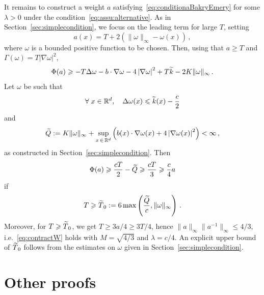 \documentclass[AHL,Unicode,longabstracts,published]{cedram}
\newcommand{\R}{\mathbb R}
\newcommand{\na}{\nabla}
\newcommand{\1}{\mathbbm{1}}
\newcommand{\nv}[1]{#1}
\let\oldtilde\tilde
\renewcommand*{\tilde}[1]{\mathchoice{\widetilde{#1}}{\widetilde{#1}}{\oldtilde{#1}}{\oldtilde{#1}}}
\let\oldforall\forall
\renewcommand*{\forall}{\mathrel{\oldforall}}
\newcommand{\R}{\mathbb R}
\begin{document}
It remains to construct a weight $a$ satisfying~\eqref{eq:conditionaBakryEmery} for some $\lambda>0$ under the condition~\eqref{eq:assu:alternative}. As in Section~\ref{sec:simplecondition}, we focus on the leading term for large $T$, setting
\[
a(x) = T + 2\left( \|\nv{\omega}\|_\infty - \nv{\omega}(x) \right) \,,
\]
where $\nv{\omega}$ is a bounded positive function to be chosen. Then, using that $a\geqslant T$ \nv{and $\Gamma(\omega)=T|\na \omega|^2$,}
\[
\Phi(a) \geqslant -T\Delta \nv{\omega} - b\cdot \na \nv{\omega} - 4\left|\nabla \nv{\omega}\right|^2 + T \tilde k -2 K\|\nv{\omega}\|_\infty \,.
\]
Let $\nv{\omega}$ be such that
\[
\forall x\in\R^d, \quad \Delta \nv{\omega} (x) \leqslant \tilde k(x) -\frac{c}{2}
\]
and
\[
\tilde Q:= K \|\nv{\omega}\|_\infty + \sup_{x\,\in\,\R^d}\left( b(x)\cdot \na \nv{\omega}(x) + 4\left|\na \nv{\omega}(x)\right|^2 \right)<\infty \,,
\]
as constructed in Section~\ref{sec:simplecondition}. Then
\[
\Phi(a) \geqslant \frac {cT}2 - \tilde Q \geqslant \frac{cT}{3} \geqslant \frac c4 a
\]
if
\[
T\geqslant \tilde T_0 := 6 \max \left( \frac{\tilde Q}{c},\|\nv{\omega}\|_\infty \right) \,.
\]
Moreover, for $T\geqslant \tilde T_0$, we get $T\geqslant 3 a/4 \geqslant 3T/4$, hence $\|a\|_\infty \|a^{-1}\|_\infty \leqslant 4/3$, i.e.~\eqref{eq:contractW} holds with $M=\sqrt{4/3}$ and $\lambda=c/4$. An explicit upper bound of $\tilde T_0$ follows from the estimates on $\nv{\omega}$ given in Section~\ref{sec:simplecondition}.

\section{Other proofs}\label{Sec:AutresPreuves}
\end{document}
